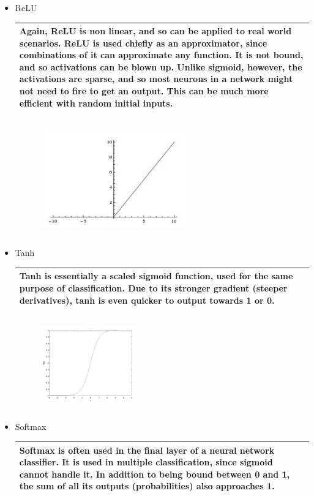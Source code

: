 \documentclass[10pt]{article}
\newenvironment{answer}
    {\begin{center}
    \begin{tabular}{|p{0.9\textwidth}|}
    \hline
    }
    { 
    \\\hline
    \end{tabular} 
    \end{center}
    }
\begin{document}
\begin{enumerate}[resume]
\begin{itemize}
\begin{figure}[h!]
      \end{figure}
      \newpage
    \item ReLU
      \begin{answer}
        Again, ReLU is non linear, and so can be applied to real world scenarios. ReLU is used chiefly as an approximator, since combinations of it can approximate any function. It is not bound, and so activations can be blown up. Unlike sigmoid, however, the activations are sparse, and so most neurons in a network might not need to fire to get an output. This can be much more efficient with random initial inputs.
      \end{answer}
      \begin{figure}[h!]
        \centering
        \includegraphics[width=0.6\textwidth,height=5cm]{hw3_10.png}
      \end{figure}
    \item Tanh
      \begin{answer}
        Tanh is essentially a scaled sigmoid function, used for the same purpose of classification. Due to its stronger gradient (steeper derivatives), tanh is even quicker to output towards 1 or 0.
      \end{answer}
      \begin{figure}[h!]
        \centering
        \includegraphics[width=0.4\textwidth,height=4cm]{hw3_11.png}
      \end{figure}
    \item Softmax
      \begin{answer}
        Softmax is often used in the final layer of a neural network classifier. It is used in multiple classification, since sigmoid cannot handle it. In addition to being bound between 0 and 1, the sum of all its outputs (probabilities) also approaches 1.

\end{answer}
\end{itemize}
\end{enumerate}
\end{document}
